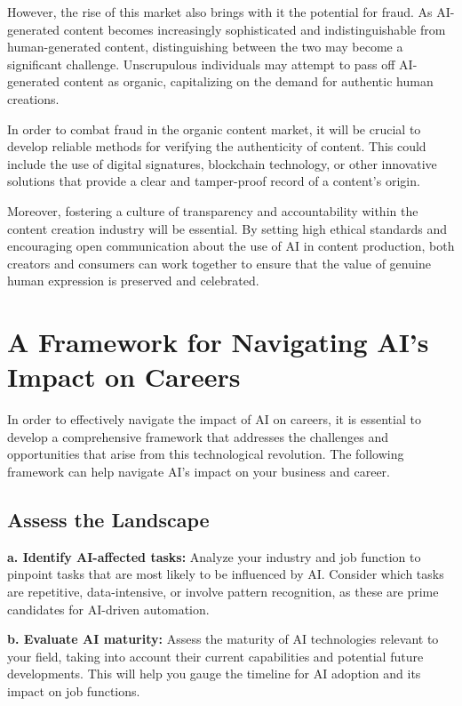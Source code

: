 However, the rise of this market also brings with it the potential for fraud. As AI-generated content becomes increasingly sophisticated and indistinguishable from human-generated content, distinguishing between the two may become a significant challenge. Unscrupulous individuals may attempt to pass off AI-generated content as organic, capitalizing on the demand for authentic human creations.

In order to combat fraud in the organic content market, it will be crucial to develop reliable methods for verifying the authenticity of content. This could include the use of digital signatures, blockchain technology, or other innovative solutions that provide a clear and tamper-proof record of a content's origin.

Moreover, fostering a culture of transparency and accountability within the content creation industry will be essential. By setting high ethical standards and encouraging open communication about the use of AI in content production, both creators and consumers can work together to ensure that the value of genuine human expression is preserved and celebrated.

\section{A Framework for Navigating AI's Impact on Careers}

In order to effectively navigate the impact of AI on careers, it is essential to develop a comprehensive framework that addresses the challenges and opportunities that arise from this technological revolution. The following framework can help navigate AI's impact on your business and career.

\subsection{Assess the Landscape}

\textbf{a. Identify AI-affected tasks:} Analyze your industry and job function to pinpoint tasks that are most likely to be influenced by AI. Consider which tasks are repetitive, data-intensive, or involve pattern recognition, as these are prime candidates for AI-driven automation.

\textbf{b. Evaluate AI maturity:} Assess the maturity of AI technologies relevant to your field, taking into account their current capabilities and potential future developments. This will help you gauge the timeline for AI adoption and its impact on job functions.

